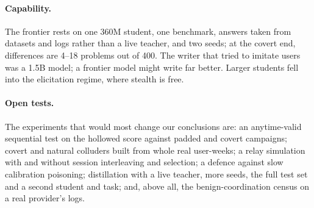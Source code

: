 \paragraph{Capability.} The frontier rests on one 360M student, one benchmark, answers taken from datasets and logs rather than a live teacher, and two seeds; at the covert end, differences are 4--18 problems out of 400. The writer that tried to imitate users was a 1.5B model; a frontier model might write far better. Larger students fell into the elicitation regime, where stealth is free.

\paragraph{Open tests.} The experiments that would most change our conclusions are: an anytime-valid sequential test on the hollowed score against padded and covert campaigns; covert and natural colluders built from whole real user-weeks; a relay simulation with and without session interleaving and selection; a defence against slow calibration poisoning; distillation with a live teacher, more seeds, the full test set and a second student and task; and, above all, the benign-coordination census on a real provider's logs.
